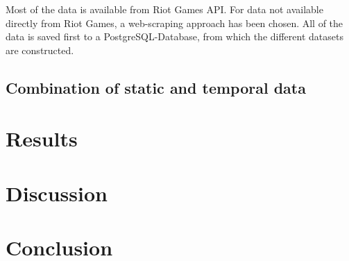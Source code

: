 \documentclass[12pt, a4paper, headinclude, twoside, plainheadsepline, open=right, numbers=noenddot, hidelinks, toc=listof, toc=bibliography]{scrreprt}
\begin{document}
Most of the data is available from Riot Games API. 
For data not available directly from Riot Games, a web-scraping approach has been chosen.
All of the data is saved first to a PostgreSQL-Database, from which the different datasets are constructed.



\section{Combination of static and temporal data}
\label{sec:combination}


\chapter{Results}
\label{chap:results}


\chapter{Discussion}
\label{chap:discussion}


\chapter{Conclusion}
\label{chap:conclusion}

%
%
%
\printbibliography






\listoffigures																			%
\listoftables																			%
\cleardoublepage{}	%
\printacronyms[heading={chapter*}, name={List of Abbreviations}]
\end{document}
